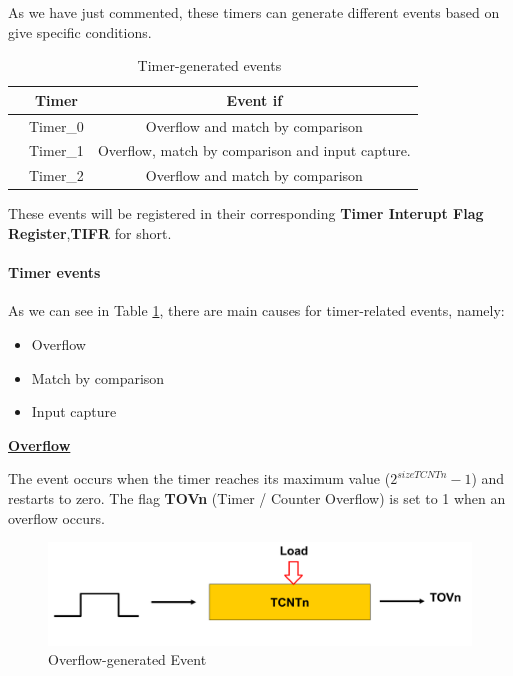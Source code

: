 \clearpage

As we have just commented, these timers can generate different events based on give specific conditions. 

\begin{table}[H]
    \centering
    \begin{tabular}[t]{lcc}
        \toprule
        & \textbf{Timer} & \textbf{Event if} \\
        \midrule
        & Timer\_0 & Overflow and match by comparison                 \\
        & Timer\_1 & Overflow, match by comparison and input capture. \\
        & Timer\_2 & Overflow and match by comparison                 \\
        \bottomrule
    \end{tabular}
    \caption{Timer-generated events~\autocite{ATMEGA328P}}
    \label{table:ATMEGA_TIMERS}
\end{table}


These events will be registered in their corresponding \textbf{Timer Interupt Flag Register},\textbf{TIFR} for short.

\paragraph{Timer events}

As we can see in Table \ref{table:ATMEGA_TIMERS}, there are main causes for timer-related events, namely:

\begin{itemize}
    \item Overflow
    \item Match by comparison
    \item Input capture
\end{itemize}

\medskip
\underline{\textbf{Overflow}}
\medskip

The event occurs when the timer reaches its maximum value ($2^{sizeTCNTn} - 1$) and restarts to zero. The flag \textbf{TOVn} (Timer / Counter Overflow) is set to 1 when an overflow occurs.

\begin{figure}[H]
    \centering
    \includegraphics[width = \textwidth]{Graphics/MICROS/Practice 4/SLIDES/OVERFLOW.pdf}
    \caption{Overflow-generated Event~\autocite{SLIDES_MICROS}}
    \label{fig:OVERFLOW}
\end{figure}

